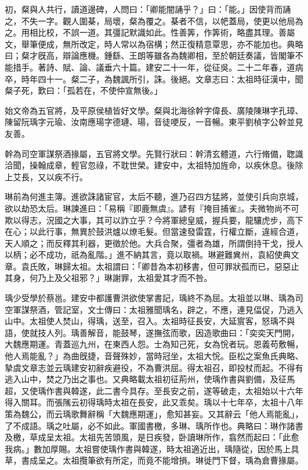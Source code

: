 \begin{pinyinscope}
初，粲與人共行，讀道邊碑，人問曰：「卿能闇誦乎？」曰：「能。」因使背而誦之，不失一字。觀人圍棊，局壞，粲為覆之。棊者不信，以帊蓋局，使更以他局為之。用相比校，不誤一道。其彊記默識如此。性善筭，作筭術，略盡其理。善屬文，舉筆便成，無所改定，時人常以為宿構；然正復精意覃思，亦不能加也。典略曰；粲才旣高，辯論應機。鍾繇、王朗等雖各為魏卿相，至於朝廷奏議，皆閣筆不能措手。著詩、賦、論、議垂六十篇。建安二十一年，從征吳。二十二年春，道病卒，時年四十一。粲二子，為魏諷所引，誅。後絕。文章志曰：太祖時征漢中，聞粲子死，歎曰：「孤若在，不使仲宣無後。」

始文帝為五官將，及平原侯植皆好文學。粲與北海徐幹字偉長、廣陵陳琳字孔璋、陳留阮瑀字元瑜、汝南應瑒字德璉、瑒，音徒哽反，一音暢。東平劉楨字公幹並見友善。

幹為司空軍謀祭酒掾屬，五官將文學。先賢行狀曰：幹清玄體道，六行脩備，聦識洽聞，操翰成章，輕官忽祿，不耽世榮。建安中，太祖特加旌命，以疾休息。後除上艾長，又以疾不行。

琳前為何進主簿。進欲誅諸宦官，太后不聽，進乃召四方猛將，並使引兵向京城，欲以劫恐太后。琳諫進曰：「易稱『即鹿無虞』。諺有『掩目捕雀』。夫微物尚不可欺以得志，況國之大事，其可以詐立乎？今將軍總皇威，握兵要，龍驤虎步，高下在心；以此行事，無異於鼓洪爐以燎毛髮。但當速發雷霆，行權立斷，違經合道，天人順之；而反釋其利器，更徵於他。大兵合聚，彊者為雄，所謂倒持干戈，授人以柄；必不成功，祇為亂階。」進不納其言，竟以取禍。琳避難兾州，袁紹使典文章。袁氏敗，琳歸太祖。太祖謂曰：「卿昔為本初移書，但可罪狀孤而已，惡惡止其身，何乃上及父祖邪？」琳謝罪，太祖愛其才而不咎。

瑀少受學於蔡邕。建安中都護曹洪欲使掌書記，瑀終不為屈。太祖並以琳、瑀為司空軍謀祭酒，管記室，文士傳曰：太祖雅聞瑀名，辟之，不應，連見偪促，乃逃入山中。太祖使人焚山，得瑀，送至，召入。太祖時征長安，大延賔客，怒瑀不與語，使就技人列。瑀善解音，能鼓琴，遂撫弦而歌，因造歌曲曰：「奕奕天門開，大魏應期運。青蓋巡九州，在東西人怨。士為知己死，女為恱者玩。恩義苟敷暢，他人焉能亂？」為曲旣捷，音聲殊妙，當時冠坐，太祖大恱。臣松之案魚氏典略、摯虞文章志並云瑀建安初辭疾避役，不為曹洪屈。得太祖召，即投杖而起。不得有逃入山中，焚之乃出之事也。又典略載太祖初征荊州，使瑀作書與劉備，及征馬超，又使瑀作書與韓遂，此二書今具存。至長安之前，遂等破走，太祖始以十六年得入關耳。而張隲云初得瑀時太祖在長安，此又乖矣。瑀以十七年卒，太祖十八年策為魏公，而云瑀歌舞辭稱「大魏應期運」，愈知甚妄。又其辭云「他人焉能亂」，了不成語。瑀之吐屬，必不如此。軍國書檄，多琳、瑀所作也。典略曰：琳作諸書及檄，草成呈太祖。太祖先苦頭風，是日疾發，卧讀琳所作，翕然而起曰：「此愈我病。」數加厚賜。太祖嘗使瑀作書與韓遂，時太祖適近出，瑀隨從，因於馬上具草，書成呈之。太祖攬筆欲有所定，而竟不能增損。琳徙門下督，瑀為倉曹掾屬。


\end{pinyinscope}
